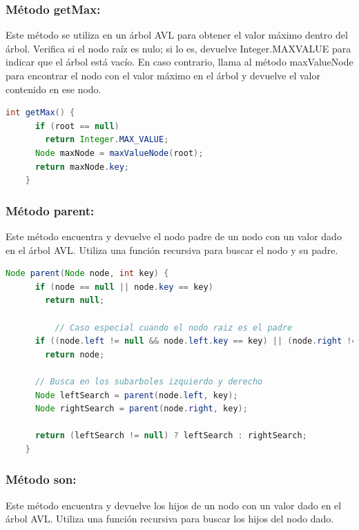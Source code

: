 \documentclass{article}
\begin{document}

  \subsubsection{Método getMax: }Este método se utiliza en un árbol AVL para obtener el valor máximo dentro del árbol. 
  Verifica si el nodo raíz es nulo; si lo es, devuelve Integer.MAXVALUE para indicar que el árbol está vacío. 
  En caso contrario, llama al método maxValueNode para encontrar el nodo con el valor máximo en el árbol y devuelve 
  el valor contenido en ese nodo.
  \begin{lstlisting}[language=Java, caption={Ejemplo de código Java}]
    int getMax() {
      if (root == null)
        return Integer.MAX_VALUE;
      Node maxNode = maxValueNode(root);
      return maxNode.key;
    }
  \end{lstlisting}
  

  \subsubsection{Método parent: }Este método encuentra y devuelve el nodo padre de un nodo con un valor dado en 
  el árbol AVL. Utiliza una función recursiva para buscar el nodo y su padre.

  \begin{lstlisting}[language=Java, caption={Ejemplo de código Java}]
    Node parent(Node node, int key) {
      if (node == null || node.key == key)
        return null;

          // Caso especial cuando el nodo raiz es el padre
      if ((node.left != null && node.left.key == key) || (node.right != null && node.right.key == key))
        return node;

      // Busca en los subarboles izquierdo y derecho
      Node leftSearch = parent(node.left, key);
      Node rightSearch = parent(node.right, key);

      return (leftSearch != null) ? leftSearch : rightSearch;
    }
  \end{lstlisting}
  

  \subsubsection{Método son: }Este método encuentra y devuelve los hijos de un nodo con un valor dado en el árbol AVL. 
  Utiliza una función recursiva para buscar los hijos del nodo dado.
  
\end{document}

